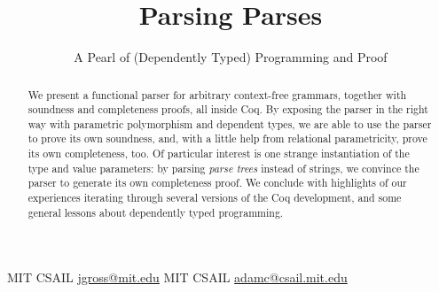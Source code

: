 \documentclass[preprint]{sigplanconf}
\begin{document}
\lstset{language=Haskell}

\setlength{\pdfpageheight}{\paperheight}
\setlength{\pdfpagewidth}{\paperwidth}






\title{Parsing Parses}
\subtitle{A Pearl of (Dependently Typed) Programming and Proof}

           {MIT CSAIL}
           {\href{mailto:jgross@mit.edu}{jgross@mit.edu}}
           {MIT CSAIL}
           {\href{mailto:adamc@csail.mit.edu}{adamc@csail.mit.edu}}

\maketitle

\begin{abstract}
We present a functional parser for arbitrary context-free grammars, together with soundness and completeness proofs, all inside Coq.  By exposing the parser in the right way with parametric polymorphism and dependent types, we are able to use the parser to prove its own soundness, and, with a little help from relational parametricity, prove its own completeness, too.  Of particular interest is one strange instantiation of the type and value parameters: by parsing \emph{parse trees} instead of strings, we convince the parser to generate its own completeness proof.  We conclude with highlights of our experiences iterating through several versions of the Coq development, and some general lessons about dependently typed programming.
\end{abstract}
\end{document}
